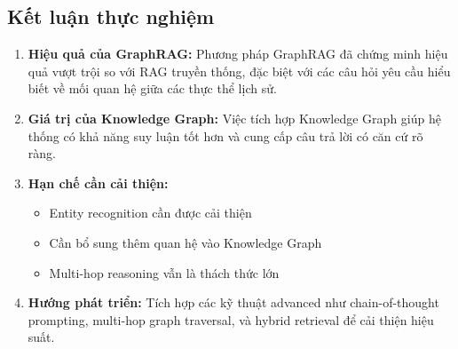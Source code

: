 \subsection{Kết luận thực nghiệm}

\begin{enumerate}
    \item \textbf{Hiệu quả của GraphRAG:} Phương pháp GraphRAG đã chứng minh hiệu quả vượt trội so với RAG truyền thống, đặc biệt với các câu hỏi yêu cầu hiểu biết về mối quan hệ giữa các thực thể lịch sử.
    
    \item \textbf{Giá trị của Knowledge Graph:} Việc tích hợp Knowledge Graph giúp hệ thống có khả năng suy luận tốt hơn và cung cấp câu trả lời có căn cứ rõ ràng.
    
    \item \textbf{Hạn chế cần cải thiện:}
    \begin{itemize}
        \item Entity recognition cần được cải thiện
        \item Cần bổ sung thêm quan hệ vào Knowledge Graph
        \item Multi-hop reasoning vẫn là thách thức lớn
    \end{itemize}
    
    \item \textbf{Hướng phát triển:} Tích hợp các kỹ thuật advanced như chain-of-thought prompting, multi-hop graph traversal, và hybrid retrieval để cải thiện hiệu suất.
\end{enumerate}
